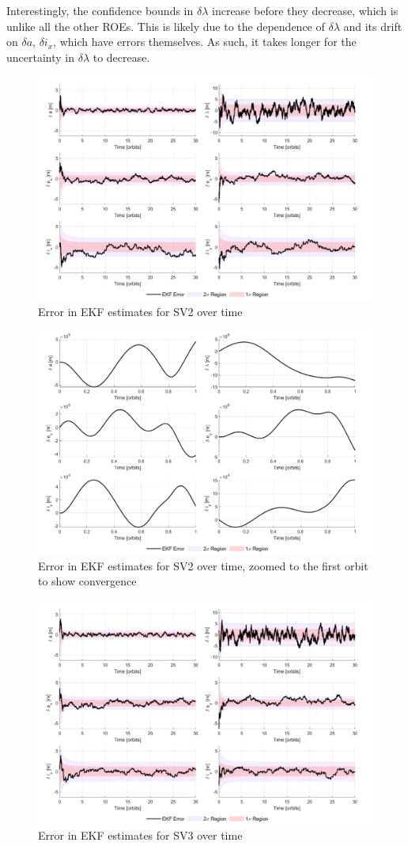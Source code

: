 Interestingly, the confidence bounds in $\delta \lambda$ increase before they decrease, which is unlike all the other ROEs. This is likely due to the dependence of $\delta \lambda$ and its drift on $\delta a$, $\delta i_x$, which have errors themselves. As such, it takes longer for the uncertainty in $\delta \lambda$ to decrease. 

\begin{figure}[H]
    \centering
    \includegraphics[width=0.7\linewidth]{sim/figures/PS8/EKF_error_SV2.png}
    \caption{Error in EKF estimates for SV2 over time}
    \label{fig:sv2_ekf_error}
\end{figure}

\begin{figure}[H]
    \centering
    \includegraphics[width=0.7\linewidth]{sim/figures/PS8/EKF_error_SV2_zoomed.png}
    \caption{Error in EKF estimates for SV2 over time, zoomed to the first orbit to show convergence}
    \label{fig:sv2_ekf_error_zoomed}
\end{figure}

\begin{figure}[H]
    \centering
    \includegraphics[width=0.7\linewidth]{sim/figures/PS8/EKF_error_SV3.png}
    \caption{Error in EKF estimates for SV3 over time}
    \label{fig:sv3_ekf_error}
\end{figure}

